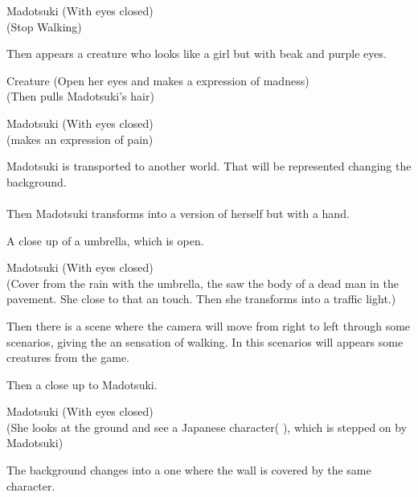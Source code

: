 \documentclass{screenplay}
\begin{document}
	\begin{dialogue}{Madotsuki}
		(With eyes closed)\\
		(Stop Walking)
	\end{dialogue}
	 
	 Then appears a creature who looks like a girl but with beak and purple eyes.
	 
	 \begin{dialogue}{Creature}
		(Open her eyes and makes a expression of madness)\\
		(Then pulls Madotsuki's hair)
	\end{dialogue}
	
	\begin{dialogue}{Madotsuki}
		(With eyes closed)\\
		(makes an expression of pain)
	\end{dialogue}
	
	Madotsuki is transported to another world. That will be represented changing the background.\\~\\
	
	Then Madotsuki transforms into a version of herself but with a hand.
	
	A close up of a umbrella, which is open.
	
	\begin{dialogue}{Madotsuki}
		(With eyes closed)\\
		(Cover from the rain with the umbrella, the saw the body of a dead man in the pavement. She close to that an touch. Then she transforms into a traffic light.)
	\end{dialogue}
	
	Then there is a scene where the camera will move from right to left through some scenarios, giving the an sensation of walking. In this scenarios will appears some creatures from the game.
	
	Then a close up to Madotsuki.
	\begin{dialogue}{Madotsuki}
		(With eyes closed)\\
		(She looks at the ground and see a Japanese character( ), which is stepped on by Madotsuki)
	\end{dialogue}
	
	The background changes into a one where the wall is covered by the same character.	
	
\end{document}
